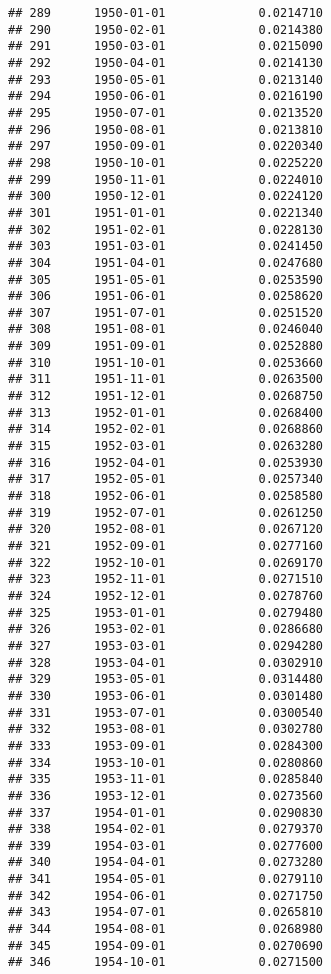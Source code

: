 \documentclass[
]{article}
\begin{document}
\begin{verbatim}
## 289      1950-01-01             0.0214710
## 290      1950-02-01             0.0214380
## 291      1950-03-01             0.0215090
## 292      1950-04-01             0.0214130
## 293      1950-05-01             0.0213140
## 294      1950-06-01             0.0216190
## 295      1950-07-01             0.0213520
## 296      1950-08-01             0.0213810
## 297      1950-09-01             0.0220340
## 298      1950-10-01             0.0225220
## 299      1950-11-01             0.0224010
## 300      1950-12-01             0.0224120
## 301      1951-01-01             0.0221340
## 302      1951-02-01             0.0228130
## 303      1951-03-01             0.0241450
## 304      1951-04-01             0.0247680
## 305      1951-05-01             0.0253590
## 306      1951-06-01             0.0258620
## 307      1951-07-01             0.0251520
## 308      1951-08-01             0.0246040
## 309      1951-09-01             0.0252880
## 310      1951-10-01             0.0253660
## 311      1951-11-01             0.0263500
## 312      1951-12-01             0.0268750
## 313      1952-01-01             0.0268400
## 314      1952-02-01             0.0268860
## 315      1952-03-01             0.0263280
## 316      1952-04-01             0.0253930
## 317      1952-05-01             0.0257340
## 318      1952-06-01             0.0258580
## 319      1952-07-01             0.0261250
## 320      1952-08-01             0.0267120
## 321      1952-09-01             0.0277160
## 322      1952-10-01             0.0269170
## 323      1952-11-01             0.0271510
## 324      1952-12-01             0.0278760
## 325      1953-01-01             0.0279480
## 326      1953-02-01             0.0286680
## 327      1953-03-01             0.0294280
## 328      1953-04-01             0.0302910
## 329      1953-05-01             0.0314480
## 330      1953-06-01             0.0301480
## 331      1953-07-01             0.0300540
## 332      1953-08-01             0.0302780
## 333      1953-09-01             0.0284300
## 334      1953-10-01             0.0280860
## 335      1953-11-01             0.0285840
## 336      1953-12-01             0.0273560
## 337      1954-01-01             0.0290830
## 338      1954-02-01             0.0279370
## 339      1954-03-01             0.0277600
## 340      1954-04-01             0.0273280
## 341      1954-05-01             0.0279110
## 342      1954-06-01             0.0271750
## 343      1954-07-01             0.0265810
## 344      1954-08-01             0.0268980
## 345      1954-09-01             0.0270690
## 346      1954-10-01             0.0271500

\end{verbatim}
\end{document}
